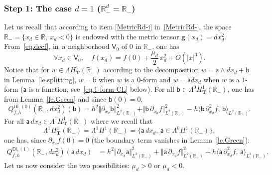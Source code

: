\documentclass[JEP,XML,SOM,Unicode,NoEqCountersInSection,NoFloatCountersInSection,published]{cedram}
\newcommand{\mbf}[1]{\mathbf{#1}}
\let\lp\langle
\let\rp\rangle
\theoremstyle{plain}
\theoremstyle{definition}
\begin{document}
\subsubsection*{Step 1: The case $d=1$ (\ie $\mathbb R^d_-=\mathbb R_-$)}
Let us recall that according to item \eqref{MetricRd-i} in~\ref{MetricRd-}, the
space $\mathbb R_-=\{x_d\in \mathbb R,\ x_d<0\}$ is endowed with the
metric tensor $\mbf g(x_d)=dx_d^2$.
From~\eqref{eq.decf}, in~a neighborhood $\mathsf V_0$ of $0$ in $\mathbb R_-$, one has
\[
\forall x_d\in \mathsf V_0,\quad f(x_d)= f(0)+ \frac{\mu_{d}}{2}\, x_d^2 +O(|x|^3).
\]
Notice that for $w\in \Lambda H^1_{\mbf T}(\mathbb R_-)$ according to the decomposition $w=\mathsf a\wedge dx_d+\mathsf b$ in Lemma~\ref{le.splitting}, $w=\mathsf b$ when $w$ is a $0$-form and $w=\mathsf a dx_d$ when $w$ is a $1$-form ($\mathsf a$ is a function, see~\eqref{eq.1-form-CL} below).
For all $\mathsf b \in \Lambda^0 H^1_{\mbf T}(\mathbb R_-)$, one has from Lemma~\ref{le.Green} and since $\mathsf b(0)=0$,
\begin{equation}\label{eq.1bb-<}
Q_{f,h}^{\mathsf{Di},(0)}(\mathbb R_-,dx_d^2)(\mathsf b)= h^2 \Vert \partial_{x_d} \mathsf b \Vert_{L^2(\mathbb R_-)}^2+ \Vert \mathsf b\, \partial_{x_d} f \Vert_{L^2(\mathbb R_-)}^2-h\lp \mathsf b \, \partial_{x_d}^2 f, \, \mathsf b \rp_{L^2(\mathbb R_-)}.
\end{equation}
For all $\mathsf a \, dx_d\in \Lambda^1 H^1_{\mbf T}(\mathbb R_-)$ where we recall that
\begin{equation}\label{eq.1-form-CL}
\Lambda^1 H^1_{\mbf T}(\mathbb R_-) =\Lambda^1 H^1(\mathbb R_-)=\big \{\mathsf a \, dx_d,\, \mathsf a \in \Lambda^0 H^1(\mathbb R_-)\big \},
\end{equation}
one has, since $\partial_{x_d} f(0)=0$ (the boundary term vanishes in Lemma~\ref{le.Green}):
\begin{align*}
Q_{f,h}^{\mathsf{Di},(1)}(\mathbb R_-, dx_d^2)(\mathsf a \, dx_d)& \! = \! h^2\big \Vert \partial_{x_d} \mathsf a \big \Vert_{L^2(\mathbb
R_-)}^2
\!+\! \big
\Vert
\mathsf
a\,
\partial_{x_d}
f\big
\Vert_{L^2(\mathbb
R_-)}^2 \!+\! h\lp \mathsf a \, \partial_{x_d}^2 f, \, \mathsf a \rp_{L^2(\mathbb R_-)}.
\end{align*}
Let us now consider the two possibilities: $\mu_d>0$ or $\mu_d < 0$.
\end{document}

